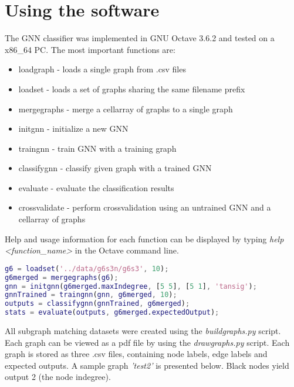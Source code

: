 
\chapter{Using the software\label{chapter:using}}
\noindent The GNN classifier was implemented in GNU Octave 3.6.2 and tested on a x86\_64 PC. The most important functions are:
\begin{itemize}
	\item loadgraph - loads a single graph from .csv files
	\item loadset - loads a set of graphs sharing the same filename prefix
	\item mergegraphs - merge a cellarray of graphs to a single graph
	\item initgnn - initialize a new GNN
	\item traingnn - train GNN with a training graph
	\item classifygnn - classify given graph with a trained GNN
	\item evaluate - evaluate the classification results
	\item crossvalidate - perform crossvalidation using an untrained GNN and a cellarray of graphs
\end{itemize}
\noindent Help and usage information for each function can be displayed by typing \emph{help <function\_name>} in the Octave command line.\\



\begin{lstlisting}[style=outcode, language=Matlab, caption=Sample usage session]
g6 = loadset('../data/g6s3n/g6s3', 10);
g6merged = mergegraphs(g6);
gnn = initgnn(g6merged.maxIndegree, [5 5], [5 1], 'tansig');
gnnTrained = traingnn(gnn, g6merged, 10);
outputs = classifygnn(gnnTrained, g6merged);
stats = evaluate(outputs, g6merged.expectedOutput);
\end{lstlisting}

\noindent All subgraph matching datasets were created using the \emph{buildgraphs.py} script. Each graph can be viewed as a pdf file by using the \emph{drawgraphs.py} script. Each graph is stored as three .csv files, containing node labels, edge labels and expected outputs. A sample graph \emph{'test2'} is presented below. Black nodes yield output 2 (the node indegree).

\begin{figure}
\begin{floatrow}
\end{floatrow}
\end{figure}
